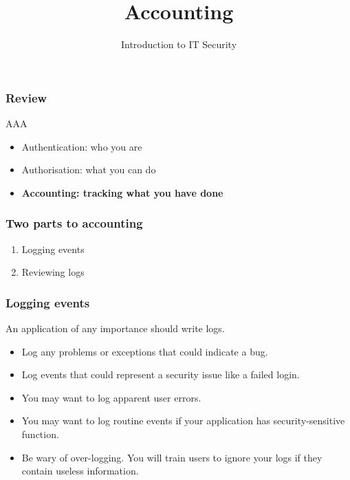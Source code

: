 \documentclass[10pt]{beamer}
\title{Accounting}
\author[IN618]{Introduction to IT Security}
\institute[Otago Polytechnic]{
  Otago Polytechnic \\
  Dunedin, New Zealand \\
}
\date{}
\begin{document}
\begin{frame}[plain]
  \titlepage
\end{frame}


\begin{frame}
  \frametitle{Review}

 AAA

 \begin{itemize}
	 \item Authentication: who you are 
	 \item Authorisation: what you can do
	 \item \textbf{Accounting: tracking what you have done}
 \end{itemize}
\end{frame}

\begin{frame}
  \frametitle{Two parts to accounting}

 \begin{enumerate}
  \item Logging events
  \item Reviewing logs
  \end{enumerate}
\end{frame}

\begin{frame}
  \frametitle{Logging events}

  An application of any importance should write logs.
 \begin{itemize}
  \item Log any problems or exceptions that could indicate a bug.
  \item Log events that could represent a security issue like a failed login.
  \item You may want to log apparent user errors.
  \item You may want to log routine events if your application has security-sensitive function.
  \item Be wary of over-logging.  You will train users to ignore your logs if they contain useless information.
  \end{itemize}
\end{frame}
\end{document}

